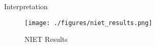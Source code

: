\documentclass[presentation, smaller]{beamer}
\begin{document}
\begin{frame}[label={sec:org35cc650}]{Interpretation}
\begin{figure}[htbp]
\centering
\texttt{[image: ./figures/niet\_results.png]}
\caption[interp]{\label{fig:orgeb8646b}
NIET Results}
\end{figure}
\end{frame}
\end{document}
